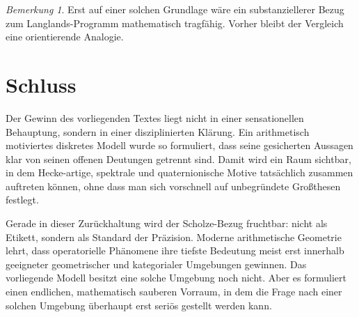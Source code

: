 \documentclass[12pt,a4paper]{article}
\theoremstyle{plain}
\theoremstyle{definition}
\theoremstyle{remark}
\newtheorem{bemerkung}[satz]{Bemerkung}
\begin{document}
\begin{bemerkung}
Erst auf einer solchen Grundlage wäre ein substanziellerer Bezug zum Langlands-Programm mathematisch tragfähig. Vorher bleibt der Vergleich eine orientierende Analogie.
\end{bemerkung}

\section{Schluss}
Der Gewinn des vorliegenden Textes liegt nicht in einer sensationellen Behauptung, sondern in einer disziplinierten Klärung. Ein arithmetisch motiviertes diskretes Modell wurde so formuliert, dass seine gesicherten Aussagen klar von seinen offenen Deutungen getrennt sind. Damit wird ein Raum sichtbar, in dem Hecke-artige, spektrale und quaternionische Motive tatsächlich zusammen auftreten können, ohne dass man sich vorschnell auf unbegründete Großthesen festlegt.

Gerade in dieser Zurückhaltung wird der Scholze-Bezug fruchtbar: nicht als Etikett, sondern als Standard der Präzision. Moderne arithmetische Geometrie lehrt, dass operatorielle Phänomene ihre tiefste Bedeutung meist erst innerhalb geeigneter geometrischer und kategorialer Umgebungen gewinnen. Das vorliegende Modell besitzt eine solche Umgebung noch nicht. Aber es formuliert einen endlichen, mathematisch sauberen Vorraum, in dem die Frage nach einer solchen Umgebung überhaupt erst seriös gestellt werden kann.
\end{document}
